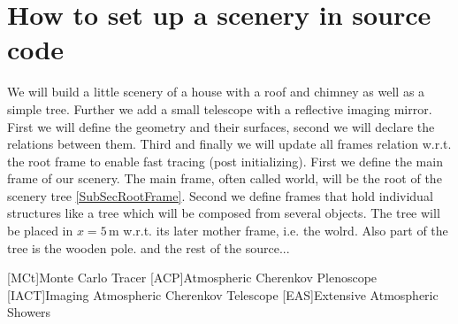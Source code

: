 \documentclass[11pt,a4paper,oneside,titlepage]{book}
\begin{document}
\chapter{How to set up a scenery in source code}
%
We will build a little scenery of a house with a roof and chimney as well as a simple tree. Further we add a small telescope with a reflective imaging mirror.
%
First we will define the geometry and their surfaces, second we will declare the relations between them. Third and finally we will update all frames relation w.r.t. the root frame to enable fast tracing (post initializing).
% 
%
First we define the main frame of our scenery. The main frame, often called world, will be the root of the scenery tree \ref{SubSecRootFrame}. 
%
%
Second we define frames that hold individual structures like a tree which will be composed from several objects. The tree will be placed in $x=5\,$m w.r.t. its later mother frame, i.e. the wolrd. 
%
Also part of the tree is the wooden pole.
and the rest of the source...
\renewcommand{\bibname}{References}

  
\addcontentsline{toc}{chapter}{\bibname}
%
\begin{acronym}
    [MCt]{Monte Carlo Tracer}
    [ACP]{Atmospheric Cherenkov Plenoscope}
    [IACT]{Imaging Atmospheric Cherenkov Telescope}
    [EAS]{Extensive Atmospheric Showers}
\end{acronym}
\end{document}
